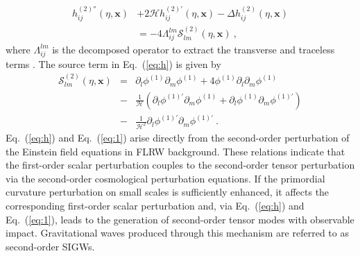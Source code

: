 \documentclass[reprint, 10pt, amsmath, amssymb, floatfix, aps, prd, superscriptaddress, nofootinbib, nobibnotes,twocolumn]{revtex4-1}
\begin{document}
\begin{equation}\label{eq:h}
	\begin{aligned}
		h_{ij}^{(2)''}(\eta,\mathbf{x})&+2 \mathcal{H} h_{ij}^{(2)'}(\eta,\mathbf{x})-\Delta h_{ij}^{(2)}(\eta,\mathbf{x}) \\
        &=-4 \Lambda_{ij}^{lm} \mathcal{S}^{(2)}_{lm}(\eta,\mathbf{x})  \ ,
	\end{aligned}
\end{equation}
where $\Lambda_{ij}^{lm}$ is the decomposed operator to extract the transverse and traceless terms \cite{Chang:2020tji}. The source term in Eq.~(\ref{eq:h}) is given by
\begin{eqnarray}
	\mathcal{S}^{(2)}_{lm}(\eta,\mathbf{x})&=&\partial_{l} \phi^{(1)} \partial_{m} \phi^{(1)} +4 \phi^{(1)} \partial_{l} \partial_{m} \phi^{(1)}\nonumber\\
    &-&\frac{1}{ \mathcal{H}}\left(\partial_{l} \phi^{(1)'} \partial_{m} \phi^{(1)}+\partial_{l} \phi^{(1)}  \partial_{m} \phi^{(1)'}\right) \nonumber\\
	&-&\frac{1}{ \mathcal{H}^{2}} \partial_{l} \phi^{(1)'} \partial_{m}  \phi^{(1)'} \ .
	\label{eq:1} 
\end{eqnarray}
Eq.~(\ref{eq:h}) and Eq.~(\ref{eq:1}) arise directly from the second-order perturbation of the Einstein field equations in \ac{FLRW} background. These relations indicate that the first-order scalar perturbation couples to the second-order tensor perturbation via the second-order cosmological perturbation equations. If the primordial curvature perturbation on small scales is sufficiently enhanced, it affects the corresponding first-order scalar perturbation and, via Eq.~(\ref{eq:h}) and Eq.~(\ref{eq:1}), leads to the generation of second-order tensor modes with observable impact. Gravitational waves produced through this mechanism are referred to as second-order \acp{SIGW}.
\end{document}
